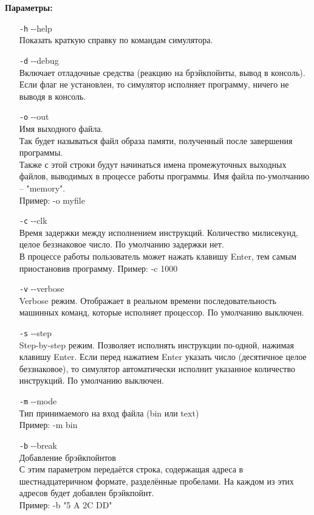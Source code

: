 {\bf Параметры:}
\begin{enumerate}
	\item[{\tt\large -h}] {-}-help \\
	Показать краткую справку по командам симулятора.\\
	
	\item[{\tt\large -d}] {-}-debug \\
	Включает отладочные средства (реакцию на брэйкпойнты, вывод в консоль).
	Если флаг не  установлен, то симулятор исполняет программу, ничего не выводя в консоль.
	
	\item[{\tt\large -o}] {-}-out \\
	Имя выходного файла. \\ 
	Так будет называться файл образа памяти, полученный после завершения программы.\\
	Также с этой строки будут начинаться имена промежуточных выходных файлов, выводимых в процессе работы программы. Имя файла по-умолчанию -- "memory".\\
	Пример: -o myfile
	
	\item[{\tt\large -c}] {-}-clk \\
	Время задержки между исполнением инструкций. Количество милисекунд, целое беззнаковое число. По умолчанию задержки нет.\\
	В процессе работы пользователь может нажать клавишу Enter, тем самым приостановив программу.
	Пример: -c 1000
	
	\item[{\tt\large -v}] {-}-verbose \\
	Verbose режим. Отображает в реальном времени последовательность машинных команд, которые исполняет процессор. По умолчанию выключен.
	
	\item[{\tt\large -s}] {-}-step \\
	Step-by-step режим. Позволяет исполнять инструкции по-одной, нажимая клавишу Enter. Если перед нажатием Enter указать число (десятичное целое беззнаковое), то симулятор автоматически исполнит указанное количество инструкций. По умолчанию выключен.
	
	\item[{\tt\large -m}] {-}-mode \\
	Тип принимаемого на вход файла (bin или text) \\
	Пример: -m bin
	
	\item[{\tt\large -b}] {-}-break \\
	Добавление брэйкпойнтов \\
	С этим параметром передаётся строка, содержащая адреса в шестнадцатеричном формате, разделённые пробелами. На каждом из этих адресов будет добавлен брэйкпойнт. \\
	Пример: -b "5 A 2C DD"
	

\end{enumerate}
